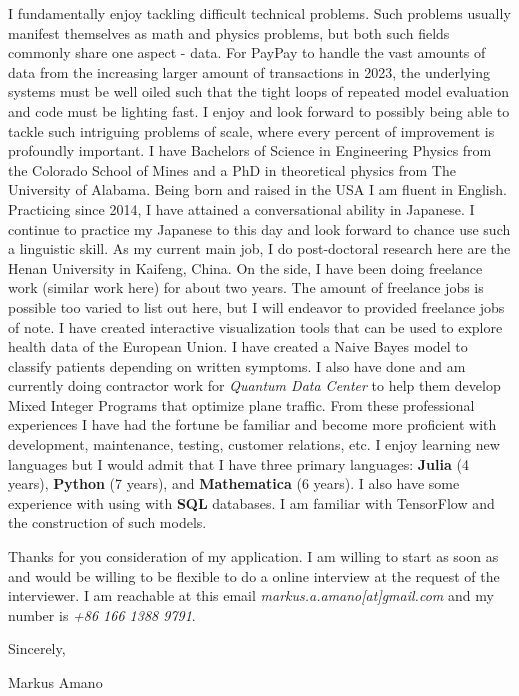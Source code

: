 \documentclass[fontsize=12pt]{article}
\begin{document}
I fundamentally enjoy tackling difficult technical problems.
%
Such problems usually manifest themselves as math and physics problems, but both such 
fields commonly share one aspect - data.
%
For PayPay to handle the vast amounts of data from the increasing larger amount of 
transactions in 2023, the underlying systems must be well oiled such that the tight loops of 
repeated model evaluation and code must be lighting fast.
%
I enjoy and look forward to possibly being able to tackle such intriguing problems of scale, 
where every percent of improvement is profoundly important. 
%
I have Bachelors of Science in Engineering Physics from the Colorado School of Mines and a PhD in theoretical physics from The University of Alabama.
Being born and raised in the USA I am fluent in English.
Practicing since 2014, I have attained a conversational ability in Japanese. 
%
I continue to practice my Japanese to this day and look forward to chance use such a 
linguistic skill.
As my current main job, I do post-doctoral research here are the Henan University 
in Kaifeng, China.
%
On the side, I have been doing freelance work (similar work here) for about two years.
%
The amount of freelance jobs is possible too varied to list out here, but I will endeavor to 
provided freelance jobs of note.
%
I have created interactive visualization tools that can be used to explore health data of 
the European Union.
%
I have created a Naive Bayes model to classify patients depending on written symptoms.
%
I also have done and am currently doing contractor work for \textit{Quantum Data Center} to help them develop Mixed Integer Programs that optimize plane traffic.
%
From these professional experiences I have had the fortune be familiar and become more 
proficient with development, maintenance, testing, customer relations, etc.
I enjoy learning new languages but I would admit that I have three primary languages: 
\textbf{Julia} (4 years), \textbf{Python} (7 years), and \textbf{Mathematica} (6 years).
%
I also have some experience with using with \textbf{SQL} databases.
I am familiar with TensorFlow and the construction of such models.

Thanks for you consideration of my application.
%
I am willing to start as soon as and would be willing to be flexible to do a online 
interview at the request of the interviewer.
%
I am reachable at this email \textit{markus.a.amano[at]gmail.com} 
and my number is \textit{+86 166 1388 9791}.

Sincerely,

Markus Amano
\end{document}
